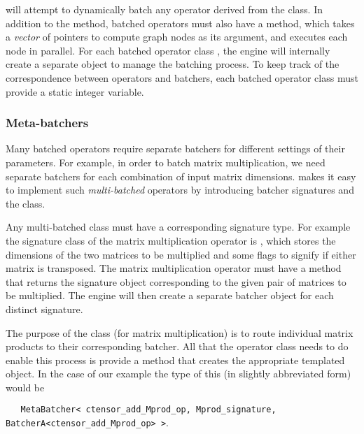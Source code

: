 \Cengine{} will attempt to dynamically batch any operator derived from the  class. 
In addition to the  method, batched operators must also have a  method, 
which takes a \emph{vector} of pointers to compute graph nodes as its argument, and executes 
each node in parallel. For each batched operator class , the engine will internally 
create a separate  object to manage the batching process. 
To keep track of the correspondence between operators and batchers, each batched operator 
class must provide a static integer  variable. 

\subsubsection*{Meta-batchers}

Many batched operators require separate batchers for different settings of their parameters. For example, 
in order to batch matrix multiplication, we need separate batchers for each combination of input matrix 
dimensions. \Cengine{} makes it easy to implement such \emph{multi-batched} operators by introducing batcher 
signatures and the  class. 

Any multi-batched class must have a corresponding signature type. For example the signature class of the 
matrix multiplication operator is , 
which stores the dimensions of the two matrices to be multiplied and 
some flags to signify if either matrix is transposed. The matrix multiplication operator 
 must have a  method that returns the signature object 
corresponding to the given pair of matrices to be multiplied. 
The engine will then create a separate batcher object for each distinct signature. 

The purpose of the  class (for matrix multiplication) is to 
route individual matrix products to their corresponding batcher.  
All that the operator class needs to do enable this process is provide a 
 method that creates the appropriate templated  object. 
In the case of our example the type of this (in slightly abbreviated form) would be 

\texttt{~~~MetaBatcher< ctensor\_add\_Mprod\_op, Mprod\_signature, BatcherA<ctensor\_add\_Mprod\_op> >}.


